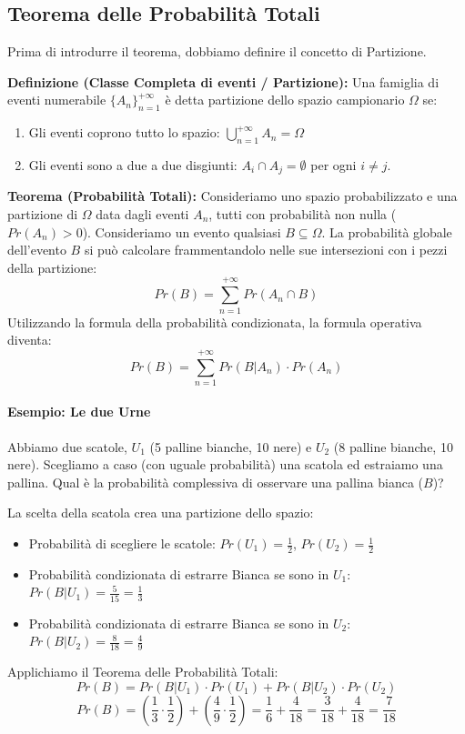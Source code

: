 \documentclass[12pt, a4paper]{article}
\begin{document}
\subsection{Teorema delle Probabilità Totali}

Prima di introdurre il teorema, dobbiamo definire il concetto di Partizione.

\textbf{Definizione (Classe Completa di eventi / Partizione):} Una famiglia di eventi numerabile $\{A_n\}_{n=1}^{+\infty}$ è detta partizione dello spazio campionario $\Omega$ se:
\begin{enumerate}
    \item Gli eventi coprono tutto lo spazio: $\bigcup_{n=1}^{+\infty} A_n = \Omega$
    \item Gli eventi sono a due a due disgiunti: $A_i \cap A_j = \emptyset$ per ogni $i \ne j$.
\end{enumerate}

\textbf{Teorema (Probabilità Totali):} Consideriamo uno spazio probabilizzato e una partizione di $\Omega$ data dagli eventi $A_n$, tutti con probabilità non nulla ($Pr(A_n) > 0$). Consideriamo un evento qualsiasi $B \subseteq \Omega$.
La probabilità globale dell'evento $B$ si può calcolare frammentandolo nelle sue intersezioni con i pezzi della partizione:
$$ Pr(B) = \sum_{n=1}^{+\infty} Pr(A_n \cap B) $$
Utilizzando la formula della probabilità condizionata, la formula operativa diventa:
$$ Pr(B) = \sum_{n=1}^{+\infty} Pr(B | A_n) \cdot Pr(A_n) $$

\paragraph{Esempio: Le due Urne}
Abbiamo due scatole, $U_1$ (5 palline bianche, 10 nere) e $U_2$ (8 palline bianche, 10 nere). 
Scegliamo a caso (con uguale probabilità) una scatola ed estraiamo una pallina. Qual è la probabilità complessiva di osservare una pallina bianca ($B$)?

La scelta della scatola crea una partizione dello spazio:
\begin{itemize}
    \item Probabilità di scegliere le scatole: $Pr(U_1) = \frac{1}{2}$, $Pr(U_2) = \frac{1}{2}$
    \item Probabilità condizionata di estrarre Bianca se sono in $U_1$: $Pr(B | U_1) = \frac{5}{15} = \frac{1}{3}$
    \item Probabilità condizionata di estrarre Bianca se sono in $U_2$: $Pr(B | U_2) = \frac{8}{18} = \frac{4}{9}$
\end{itemize}
Applichiamo il Teorema delle Probabilità Totali:
$$ Pr(B) = Pr(B | U_1) \cdot Pr(U_1) + Pr(B | U_2) \cdot Pr(U_2) $$
$$ Pr(B) = \left(\frac{1}{3} \cdot \frac{1}{2}\right) + \left(\frac{4}{9} \cdot \frac{1}{2}\right) = \frac{1}{6} + \frac{4}{18} = \frac{3}{18} + \frac{4}{18} = \frac{7}{18} $$
\end{document}

